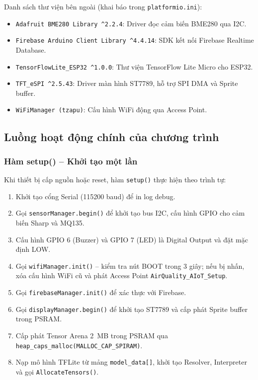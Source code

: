\documentclass[12pt,a4paper]{article}
\begin{document}
Danh sách thư viện bên ngoài (khai báo trong \texttt{platformio.ini}):
\begin{itemize}
    \item \texttt{Adafruit BME280 Library \^{}2.2.4}: Driver đọc cảm biến BME280 qua I2C.
    \item \texttt{Firebase Arduino Client Library \^{}4.4.14}: SDK kết nối Firebase Realtime Database.
    \item \texttt{TensorFlowLite\_ESP32 \^{}1.0.0}: Thư viện TensorFlow Lite Micro cho ESP32.
    \item \texttt{TFT\_eSPI \^{}2.5.43}: Driver màn hình ST7789, hỗ trợ SPI DMA và Sprite buffer.
    \item \texttt{WiFiManager (tzapu)}: Cấu hình WiFi động qua Access Point.
\end{itemize}

\subsection{Luồng hoạt động chính của chương trình}

\subsubsection{Hàm setup() -- Khởi tạo một lần}

Khi thiết bị cấp nguồn hoặc reset, hàm \texttt{setup()} thực hiện theo trình tự:
\begin{enumerate}
    \item Khởi tạo cổng Serial (115200 baud) để in log debug.
    \item Gọi \texttt{sensorManager.begin()} để khởi tạo bus I2C, cấu hình GPIO cho cảm biến Sharp và MQ135.
    \item Cấu hình GPIO 6 (Buzzer) và GPIO 7 (LED) là Digital Output và đặt mặc định LOW.
    \item Gọi \texttt{wifiManager.init()} -- kiểm tra nút BOOT trong 3 giây; nếu bị nhấn, xóa cấu hình WiFi cũ và phát Access Point \texttt{AirQuality\_AIoT\_Setup}.
    \item Gọi \texttt{firebaseManager.init()} để xác thực với Firebase.
    \item Gọi \texttt{displayManager.begin()} để khởi tạo ST7789 và cấp phát Sprite buffer trong PSRAM.
    \item Cấp phát Tensor Arena 2~MB trong PSRAM qua \texttt{heap\_caps\_malloc(MALLOC\_CAP\_SPIRAM)}.
    \item Nạp mô hình TFLite từ mảng \texttt{model\_data[]}, khởi tạo Resolver, Interpreter và gọi \texttt{AllocateTensors()}.
\end{enumerate}
\end{document}
